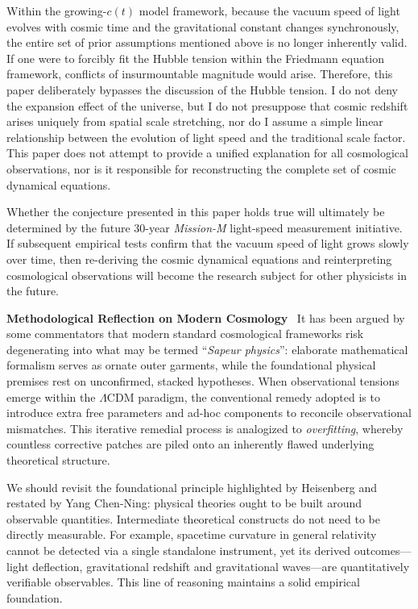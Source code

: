 \documentclass[12pt,leqno]{article}
\begin{document}
{	\medskip
	Within the growing-$c(t)$ model framework, because the vacuum speed of light evolves with cosmic time and the gravitational constant changes synchronously, the entire set of prior assumptions mentioned above is no longer inherently valid. If one were to forcibly fit the Hubble tension within the Friedmann equation framework, conflicts of insurmountable magnitude would arise. Therefore, this paper deliberately bypasses the discussion of the Hubble tension. I do not deny the expansion effect of the universe, but I do not presuppose that cosmic redshift arises uniquely from spatial scale stretching, nor do I assume a simple linear relationship between the evolution of light speed and the traditional scale factor. This paper does not attempt to provide a unified explanation for all cosmological observations, nor is it responsible for reconstructing the complete set of cosmic dynamical equations.
	
	\medskip
	Whether the conjecture presented in this paper holds true will ultimately be determined by the future 30-year \textit{Mission-M} light-speed measurement initiative. If subsequent empirical tests confirm that the vacuum speed of light grows slowly over time, then re-deriving the cosmic dynamical equations and reinterpreting cosmological observations will become the research subject for other physicists in the future.
		
	
	\medskip
	\bigskip
	\textbf{Methodological Reflection on Modern Cosmology}\,\,\,
	It has been argued by some commentators that modern standard cosmological frameworks risk degenerating into what may be termed ``\textit{Sapeur physics}'': elaborate mathematical formalism serves as ornate outer garments, while the foundational physical premises rest on unconfirmed, stacked hypotheses. When observational tensions emerge within the $\Lambda$CDM paradigm, the conventional remedy adopted is to introduce extra free parameters and ad-hoc components to reconcile observational mismatches. This iterative remedial process is analogized to \textit{overfitting}, whereby countless corrective patches are piled onto an inherently flawed underlying theoretical structure.
		
	\medskip
	We should revisit the foundational principle highlighted by Heisenberg and restated by Yang Chen-Ning: physical theories ought to be built around observable quantities. Intermediate theoretical constructs do not need to be directly measurable. For example, spacetime curvature in general relativity cannot be detected via a single standalone instrument, yet its derived outcomes—light deflection, gravitational redshift and gravitational waves—are quantitatively verifiable observables. This line of reasoning maintains a solid empirical foundation.
		
}
\end{document}
